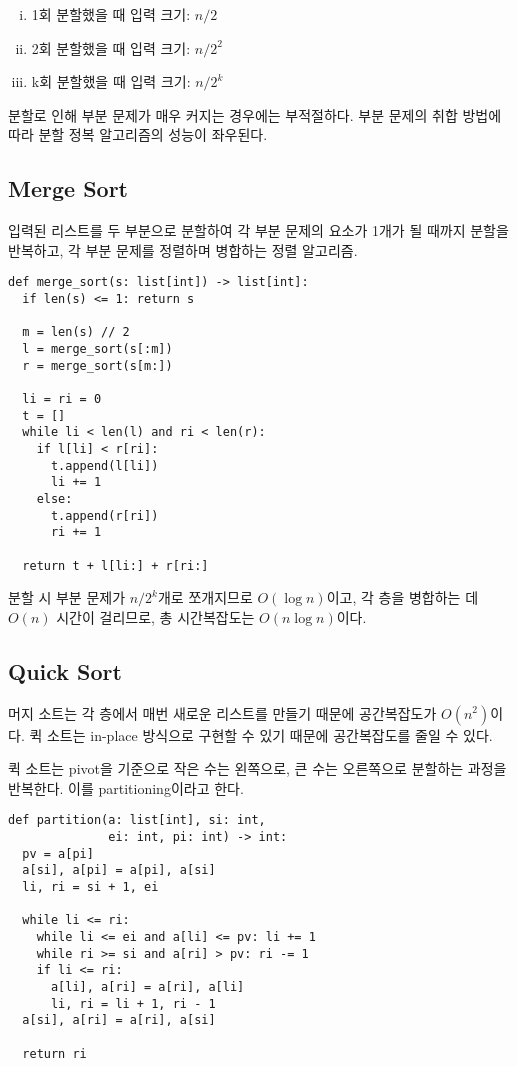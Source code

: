 \begin{enumerate}[i.]
  \item 1회 분할했을 때 입력 크기: $n / 2$
  \item 2회 분할했을 때 입력 크기: $n / 2^2$
  \item k회 분할했을 때 입력 크기: $n / 2^k$
\end{enumerate}

분할로 인해 부분 문제가 매우 커지는 경우에는 부적절하다. 부분 문제의 취합 방법에 따라 분할 정복 알고리즘의 성능이 좌우된다.

\subsection{Merge Sort}

입력된 리스트를 두 부분으로 분할하여 각 부분 문제의 요소가 1개가 될 때까지 분할을 반복하고, 각 부분 문제를 정렬하며 병합하는 정렬 알고리즘.

\begin{verbatim}
def merge_sort(s: list[int]) -> list[int]:
  if len(s) <= 1: return s

  m = len(s) // 2
  l = merge_sort(s[:m])
  r = merge_sort(s[m:])

  li = ri = 0
  t = []
  while li < len(l) and ri < len(r):
    if l[li] < r[ri]:
      t.append(l[li])
      li += 1
    else:
      t.append(r[ri])
      ri += 1

  return t + l[li:] + r[ri:]
\end{verbatim}

분할 시 부분 문제가 $n / 2^k$개로 쪼개지므로 $O(\log{n})$이고, 각 층을 병합하는 데 $O(n)$ 시간이 걸리므로, 총 시간복잡도는 $O(n \log{n})$이다.

\subsection{Quick Sort}

머지 소트는 각 층에서 매번 새로운 리스트를 만들기 때문에 공간복잡도가 $O(n^2)$이다. 퀵 소트는 in-place 방식으로 구현할 수 있기 때문에 공간복잡도를 줄일 수 있다.

퀵 소트는 pivot을 기준으로 작은 수는 왼쪽으로, 큰 수는 오른쪽으로 분할하는 과정을 반복한다. 이를 partitioning이라고 한다.

\begin{verbatim}
def partition(a: list[int], si: int,
              ei: int, pi: int) -> int:
  pv = a[pi]
  a[si], a[pi] = a[pi], a[si]
  li, ri = si + 1, ei

  while li <= ri:
    while li <= ei and a[li] <= pv: li += 1
    while ri >= si and a[ri] > pv: ri -= 1
    if li <= ri:
      a[li], a[ri] = a[ri], a[li]
      li, ri = li + 1, ri - 1
  a[si], a[ri] = a[ri], a[si]

  return ri
\end{verbatim}


